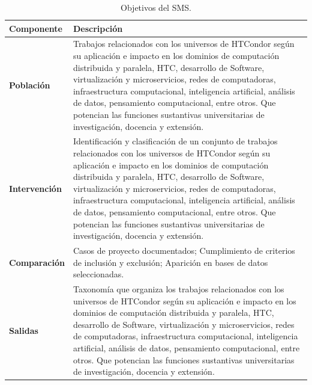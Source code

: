 \begin{table}[htbp]
	\centering
	\caption{Objetivos del SMS.}
	\label{table:PICOC}
	\renewcommand{\arraystretch}{1}  %
	\begin{tabular}{p{1.4cm}p{6.4cm}}
		\toprule
		\textbf{Componente}   & \textbf{Descripción}                                                                                                                                                                                                                                                                                                                                                                                                                                                                             \\
		\midrule
		\textbf{Población}    & Trabajos relacionados con los universos de HTCondor según su aplicación e impacto en los dominios de computación distribuida y paralela, HTC, desarrollo de Software, virtualización y microservicios, redes de computadoras, infraestructura computacional, inteligencia artificial, análisis de datos, pensamiento computacional, entre otros. Que potencian las funciones sustantivas universitarias de investigación, docencia y extensión.                                                  \\
		\addlinespace[0.8em]
		\textbf{Intervención} & Identificación y clasificación de un conjunto de trabajos relacionados con los universos de HTCondor según su aplicación e impacto en los dominios de computación distribuida y paralela, HTC, desarrollo de Software, virtualización y microservicios, redes de computadoras, infraestructura computacional, inteligencia artificial, análisis de datos, pensamiento computacional, entre otros. Que potencian las funciones sustantivas universitarias de investigación, docencia y extensión. \\
		\addlinespace[0.8em]
		\textbf{Comparación}  & Casos de proyecto documentados; Cumplimiento de criterios de inclusión y exclusión; Aparición en bases de datos seleccionadas.                                                                                                                                                                                                                                                                                                                                                                   \\
		\addlinespace[0.8em]
		\textbf{Salidas}      & Taxonomía que organiza los trabajos relacionados con los universos de HTCondor según su aplicación e impacto en los dominios de computación distribuida y paralela, HTC, desarrollo de Software, virtualización y microservicios, redes de computadoras, infraestructura computacional, inteligencia artificial, análisis de datos, pensamiento computacional, entre otros. Que potencian las funciones sustantivas universitarias de investigación, docencia y extensión.                       \\

\end{tabular}
\end{table}
